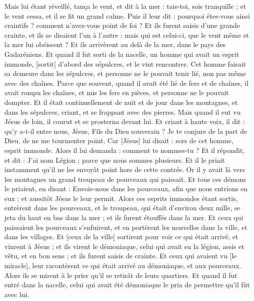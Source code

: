 \begin{multicols}{2}
Mais lui étant réveillé, tança le vent, et dit à la mer : tais-toi, sois tranquille ; et le vent cessa, et il se fit un grand calme.
Puis il leur dit : pourquoi êtes-vous ainsi craintifs ? comment n'avez-vous point de foi ?
Et ils furent saisis d'une grande crainte, et ils se disaient l'un à l'autre : mais qui est celui-ci, que le vent même et la mer lui obéissent ?
\VerseOne{}Et ils arrivèrent au delà de la mer, dans le pays des Gadaréniens.
Et quand il fut sorti de la nacelle, un homme qui avait un esprit immonde, [sortit] d'abord des sépulcres, et le vint rencontrer.
Cet homme faisait sa demeure dans les sépulcres, et personne ne le pouvait tenir lié, non pas même avec des chaînes.
Parce que souvent, quand il avait été lié de fers et de chaînes, il avait rompu les chaînes, et mis les fers en pièces, et personne ne le pouvait dompter.
Et il était continuellement de nuit et de jour dans les montagnes, et dans les sépulcres, criant, et se frappant avec des pierres.
Mais quand il eut vu Jésus de loin, il courut et se prosterna devant lui.
Et criant à haute voix, il dit : qu'y a-t-il entre nous, Jésus, Fils du Dieu souverain ? Je te conjure de la part de Dieu, de ne me tourmenter point.
Car [Jésus] lui disait : sors de cet homme, esprit immonde.
Alors il lui demanda : comment te nommes-tu ? Et il répondit, et dit : J'ai nom Légion ; parce que nous sommes plusieurs.
Et il le priait instamment qu'il ne les envoyât point hors de cette contrée.
Or il y avait là vers les montagnes un grand troupeau de pourceaux qui paissait.
Et tous ces démons le priaient, en disant : Envoie-nous dans les pourceaux, afin que nous entrions en eux ; et aussitôt Jésus le leur permit.
Alors ces esprits immondes étant sortis, entrèrent dans les pourceaux, et le troupeau, qui était d'environ deux mille, se jeta du haut en bas dans la mer ; et ils furent étouffés dans la mer.
Et ceux qui paissaient les pourceaux s'enfuirent, et en portèrent les nouvelles dans la ville, et dans les villages.
Et [ceux de la ville] sortirent pour voir ce qui était arrivé, et vinrent à Jésus ; et ils virent le démoniaque, celui qui avait eu la légion, assis et vêtu, et en bon sens ; et ils furent saisis de crainte.
Et ceux qui avaient vu [le miracle], leur racontèrent ce qui était arrivé au démoniaque, et aux pourceaux.
Alors ils se mirent à le prier qu'il se retirât de leurs quartiers.
Et quand il fut entré dans la nacelle, celui qui avait été démoniaque le pria de permettre qu'il fût avec lui.

\end{multicols}
